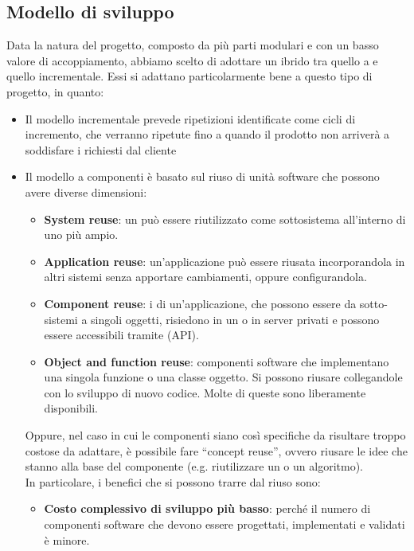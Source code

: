 	\subsection{Modello di sviluppo}\label{modello di sviluppo}
	Data la natura del progetto, composto da più parti modulari e con un basso valore di accoppiamento, abbiamo scelto di adottare un  ibrido tra quello a  e quello incrementale.
	Essi si adattano particolarmente bene a questo tipo di progetto, in quanto:
	\begin{itemize}
		\item Il modello incrementale prevede ripetizioni identificate come cicli di incremento,
		che verranno ripetute fino a quando il prodotto non arriverà a soddisfare i  richiesti dal cliente
		\item Il modello a componenti è basato sul riuso di unità software che possono avere diverse dimensioni:
		\begin{itemize}
			\item \textbf{System reuse}: un  può essere riutilizzato come sottosistema all'interno di uno più ampio.
			\item \textbf{Application reuse}: un'applicazione può essere riusata incorporandola in altri sistemi senza apportare cambiamenti, 
				oppure configurandola.
			\item \textbf{Component reuse}: i  di un'applicazione, che possono essere da sotto-sistemi a singoli oggetti, risiedono
				in un  o in server privati e possono essere accessibili tramite  (API).
			\item \textbf{Object and function reuse}: componenti software che implementano una singola funzione o una classe oggetto. Si 
				possono riusare collegandole con lo sviluppo di nuovo codice. Molte di queste sono liberamente disponibili. 
		\end{itemize}
		Oppure, nel caso in cui le componenti siano così specifiche da risultare troppo costose da adattare,
		è possibile fare ``concept reuse'', ovvero riusare le idee che stanno alla base del componente (e.g. riutilizzare un  o un algoritmo). \\
		In particolare, i benefici che si possono trarre dal riuso sono:
		\begin{itemize}
			\item \textbf{Costo complessivo di sviluppo più basso}: perché il numero di componenti software che devono essere progettati, implementati e validati è minore.

\end{itemize}
\end{itemize}
